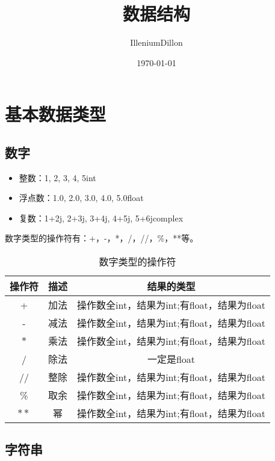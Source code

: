 \documentclass[a4paper, 12pt]{article}
\begin{document}
    \title{数据结构}
    \author{IlleniumDillon}
    \date{\today}
    \maketitle

    \section{基本数据类型}
    \subsection{数字}
    \begin{itemize}
        \item 整数：1, 2, 3, 4, 5\quad int
        \item 浮点数：1.0, 2.0, 3.0, 4.0, 5.0\quad float
        \item 复数：1+2j, 2+3j, 3+4j, 4+5j, 5+6j\quad complex
    \end{itemize}
    数字类型的操作符有：+，-，*，/，//，\%，**等。
    \begin{table}[h!]
        \centering
        \caption{数字类型的操作符}
        \begin{tabular}{|c|c|c|}
            \hline
            操作符 & 描述 & 结果的类型\\
            \hline
            + & 加法 & 操作数全int，结果为int;有float，结果为float\\
            - & 减法 & 操作数全int，结果为int;有float，结果为float\\
            $\ast$ & 乘法 & 操作数全int，结果为int;有float，结果为float\\
            / & 除法 & 一定是float\\
            // & 整除 & 操作数全int，结果为int;有float，结果为float\\
            \% & 取余 & 操作数全int，结果为int;有float，结果为float\\
            $\ast\ast$ & 幂 & 操作数全int，结果为int;有float，结果为float\\
            \hline
        \end{tabular}
    \end{table}

    \subsection{字符串}
\end{document}
